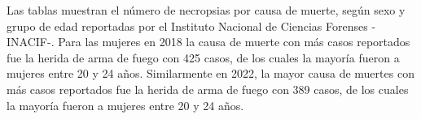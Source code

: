 Las tablas muestran el número de necropsias por causa de muerte, según sexo y grupo de edad reportadas por el Instituto Nacional de Ciencias Forenses -INACIF-. Para las mujeres en 2018 la causa de muerte con más casos reportados fue la herida de arma de fuego con 425 casos, de los cuales la mayoría fueron a mujeres entre 20 y 24 años. Similarmente en 2022, la mayor causa de muertes con más casos reportados fue la herida de arma de fuego con 389 casos, de los cuales la mayoría fueron a mujeres entre 20 y 24 años.